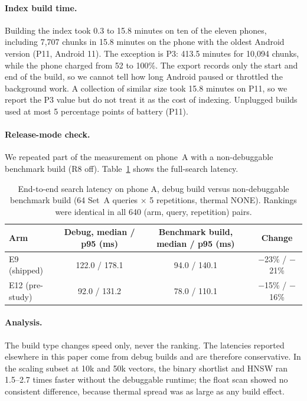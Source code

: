 \documentclass[11pt,a4paper]{article}
\begin{document}
\paragraph{Index build time.} Building the index took 0.3 to 15.8 minutes on ten of the eleven phones, including 7,707 chunks in 15.8 minutes on the phone with the oldest Android version (P11, Android 11). The exception is P3: 413.5 minutes for 10,094 chunks, while the phone charged from 52 to 100\%. The export records only the start and end of the build, so we cannot tell how long Android paused or throttled the background work. A collection of similar size took 15.8 minutes on P11, so we report the P3 value but do not treat it as the cost of indexing. Unplugged builds used at most 5 percentage points of battery (P11).

\paragraph{Release-mode check.} We repeated part of the measurement on phone~A with a non-debuggable benchmark build (R8 off). Table~\ref{tab:release} shows the full-search latency.

\begin{table}[tbp]
\centering\small
\caption{End-to-end search latency on phone A, debug build versus non-debuggable benchmark build (64 Set~A queries $\times$ 5 repetitions, thermal NONE). Rankings were identical in all 640 (arm, query, repetition) pairs.}
\label{tab:release}
\begin{tabular}{lccc}
\toprule
Arm & Debug, median / p95 (ms) & Benchmark build, median / p95 (ms) & Change \\
\midrule
E9 (shipped) & 122.0 / 178.1 & 94.0 / 140.1 & $-$23\% / $-$21\% \\
E12 (pre-study) & 92.0 / 131.2 & 78.0 / 110.1 & $-$15\% / $-$16\% \\
\bottomrule
\end{tabular}
\end{table}

\paragraph{Analysis.} The build type changes speed only, never the ranking. The latencies reported elsewhere in this paper come from debug builds and are therefore conservative. In the scaling subset at 10k and 50k vectors, the binary shortlist and HNSW ran 1.5--2.7 times faster without the debuggable runtime; the float scan showed no consistent difference, because thermal spread was as large as any build effect.
\end{document}
